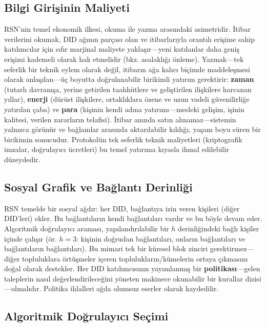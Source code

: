 \documentclass[11pt,a4paper,twocolumn]{article}
\begin{document}
\subsection{Bilgi Girişinin Maliyeti}

RSN'nin temel ekonomik ilkesi, okuma ile yazma arasındaki asimetridir. İtibar verilerini okumak, DID ağının parçası olan ve itibarlarıyla orantılı erişime sahip katılımcılar için sıfır marjinal maliyete yaklaşır---yeni katılanlar daha geniş erişimi kademeli olarak hak etmelidir (bkz. asalaklığı önleme). Yazmak---tek seferlik bir teknik eylem olarak değil, itibarın ağa kalıcı biçimde maddeleşmesi olarak anlaşılan---üç boyutta doğrulanabilir birikimli yatırım gerektirir: \textbf{zaman} (tutarlı davranışa, yerine getirilen taahhütlere ve geliştirilen ilişkilere harcanan yıllar), \textbf{enerji} (dürüst ilişkilere, ortaklıklara özene ve uzun vadeli güvenilirliğe yatırılan çaba) ve \textbf{para} (kişinin kendi adına yatırımı---mesleki gelişim, işinin kalitesi, verilen zararların telafisi). İtibar anında satın alınamaz---sistemin yalnızca görünür ve bağlamlar arasında aktarılabilir kıldığı, yaşam boyu süren bir birikimin sonucudur. Protokolün tek seferlik teknik maliyetleri (kriptografik imzalar, doğrulayıcı ücretleri) bu temel yatırıma kıyasla ihmal edilebilir düzeydedir.

\subsection{Sosyal Grafik ve Bağlantı Derinliği}

RSN temelde bir sosyal ağdır: her DID, bağlantıya izin veren kişileri (diğer DID'leri) ekler. Bu bağlantıların kendi bağlantıları vardır ve bu böyle devam eder. Algoritmik doğrulayıcı araması, yapılandırılabilir bir $h$ derinliğindeki bağlı kişiler içinde çalışır (ör. $h=3$: kişinin doğrudan bağlantıları, onların bağlantıları ve bağlantıların bağlantıları). Bu mimari tek bir küresel blok zinciri gerektirmez---diğer topluluklara örtüşmeler içeren toplulukların/kümelerin ortaya çıkmasını doğal olarak destekler. Her DID katılımcısının yayımlanmış bir \textbf{politikası}---gelen taleplerin nasıl değerlendirileceğini yöneten makinece okunabilir bir kurallar dizisi---olmalıdır. Politika ihlalleri ağda olumsuz eserler olarak kaydedilir.

\subsection{Algoritmik Doğrulayıcı Seçimi}
\end{document}
